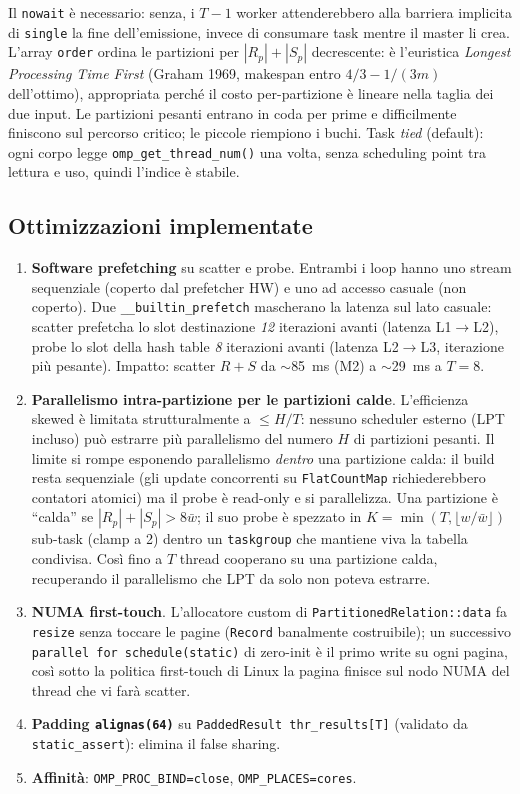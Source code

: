 \documentclass[11pt,a4paper]{article}
\theoremstyle{remark}
\begin{document}
Il \texttt{nowait} \`e necessario: senza, i $T-1$ worker attenderebbero alla barriera implicita di \texttt{single} la fine dell'emissione, invece di consumare task mentre il master li crea. L'array \texttt{order} ordina le partizioni per $|R_p|+|S_p|$ decrescente: \`e l'euristica \emph{Longest Processing Time First} (Graham 1969, makespan entro $4/3-1/(3m)$ dell'ottimo), appropriata perch\'e il costo per-partizione \`e lineare nella taglia dei due input. Le partizioni pesanti entrano in coda per prime e difficilmente finiscono sul percorso critico; le piccole riempiono i buchi. Task \emph{tied} (default): ogni corpo legge \texttt{omp\_get\_thread\_num()} una volta, senza scheduling point tra lettura e uso, quindi l'indice \`e stabile.

\subsection{Ottimizzazioni implementate}

\begin{enumerate}
  \item \textbf{Software prefetching} su scatter e probe. Entrambi i loop hanno uno stream sequenziale (coperto dal prefetcher HW) e uno ad accesso casuale (non coperto). Due \texttt{\_\_builtin\_prefetch} mascherano la latenza sul lato casuale: scatter prefetcha lo slot destinazione \emph{12} iterazioni avanti (latenza L1$\to$L2), probe lo slot della hash table \emph{8} iterazioni avanti (latenza L2$\to$L3, iterazione pi\`u pesante). Impatto: scatter $R{+}S$ da $\sim$85~ms (M2) a $\sim$29~ms a $T=8$.
  \item \textbf{Parallelismo intra-partizione per le partizioni calde}. L'efficienza skewed \`e limitata strutturalmente a $\le H/T$: nessuno scheduler esterno (LPT incluso) pu\`o estrarre pi\`u parallelismo del numero $H$ di partizioni pesanti. Il limite si rompe esponendo parallelismo \emph{dentro} una partizione calda: il build resta sequenziale (gli update concorrenti su \texttt{FlatCountMap} richiederebbero contatori atomici) ma il probe \`e read-only e si parallelizza. Una partizione \`e ``calda'' se $|R_p|+|S_p|>8\bar w$; il suo probe \`e spezzato in $K=\min(T,\lfloor w/\bar w\rfloor)$ sub-task (clamp a 2) dentro un \texttt{taskgroup} che mantiene viva la tabella condivisa. Cos\`i fino a $T$ thread cooperano su una partizione calda, recuperando il parallelismo che LPT da solo non poteva estrarre.
  \item \textbf{NUMA first-touch}. L'allocatore custom di \texttt{PartitionedRelation::data} fa \texttt{resize} senza toccare le pagine (\texttt{Record} banalmente costruibile); un successivo \texttt{parallel for schedule(static)} di zero-init \`e il primo write su ogni pagina, cos\`i sotto la politica first-touch di Linux la pagina finisce sul nodo NUMA del thread che vi far\`a scatter.
  \item \textbf{Padding \texttt{alignas(64)}} su \texttt{PaddedResult thr\_results[T]} (validato da \texttt{static\_assert}): elimina il false sharing.
  \item \textbf{Affinit\`a}: \texttt{OMP\_PROC\_BIND=close}, \texttt{OMP\_PLACES=cores}.
\end{enumerate}
\end{document}
